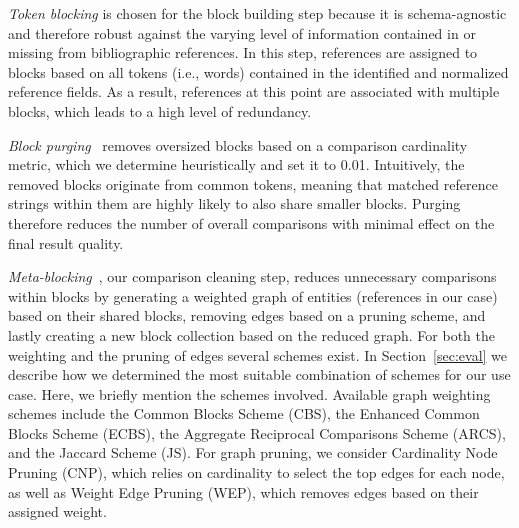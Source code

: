 \emph{Token blocking} is chosen for the block building step because it is schema-agnostic and therefore robust against the varying level of information contained in or missing from bibliographic references. In this step, references are assigned to blocks based on all tokens (i.e., words) contained in the identified and normalized reference fields. As a result, references at this point are associated with multiple blocks, which leads to a high level of redundancy.

\emph{Block purging}~\cite{Papadakis2011blockpurging} removes oversized blocks based on a comparison cardinality metric, which we determine heuristically and set it to 0.01. Intuitively, the removed blocks originate from common tokens, meaning that matched reference strings within them are highly likely to also share smaller blocks. Purging therefore reduces the number of overall comparisons with minimal effect on the final result quality.

\emph{Meta-blocking}~\cite{Papadakis2014}, our comparison cleaning step, reduces unnecessary comparisons within blocks by generating a weighted graph of entities (references in our case) based on their shared blocks, removing edges based on a pruning scheme, and lastly creating a new block collection based on the reduced graph. For both the weighting and the pruning of edges several schemes exist. In Section~\ref{sec:eval} we describe how we determined the most suitable combination of schemes for our use case. Here, we briefly mention the schemes involved. Available graph weighting schemes include the Common Blocks Scheme (CBS), the Enhanced Common Blocks Scheme (ECBS), the Aggregate Reciprocal Comparisons Scheme (ARCS), and the Jaccard Scheme (JS). For graph pruning, we consider Cardinality Node Pruning (CNP), which relies on cardinality to select the top edges for each node, as well as Weight Edge Pruning (WEP), which removes edges based on their assigned weight.



